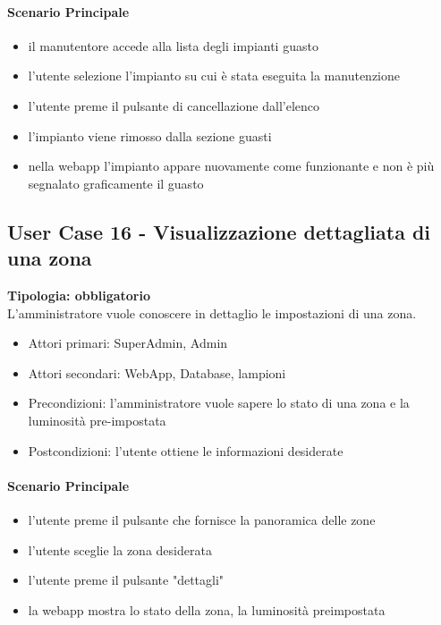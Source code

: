 \documentclass[12pt]{article}
\begin{document}
\paragraph{Scenario Principale}
\begin{itemize}
	\item il manutentore accede alla lista degli impianti guasto
	\item l'utente selezione l'impianto su cui è stata eseguita la manutenzione
	\item l'utente preme il pulsante di cancellazione dall'elenco
	\item l'impianto viene rimosso dalla sezione guasti
	\item nella webapp l'impianto appare nuovamente come funzionante e non è più segnalato graficamente il guasto
\end{itemize}

\subsection{User Case 16 - Visualizzazione dettagliata di una zona}
\textbf{Tipologia: obbligatorio} \\
L'amministratore vuole conoscere in dettaglio le impostazioni di una zona.
\begin{itemize}
	\item Attori primari: SuperAdmin, Admin
	\item Attori secondari: WebApp, Database, lampioni
	\item Precondizioni: l'amministratore vuole sapere lo stato di una zona e la luminosità pre-impostata
	\item Postcondizioni: l'utente ottiene le informazioni desiderate
\end{itemize}
\paragraph{Scenario Principale}
\begin{itemize}
	\item l'utente preme il pulsante che fornisce la panoramica delle zone
	\item l'utente sceglie la zona desiderata
	\item l'utente preme il pulsante "dettagli"
	\item la webapp mostra lo stato della zona, la luminosità preimpostata
\end{itemize}
\end{document}
